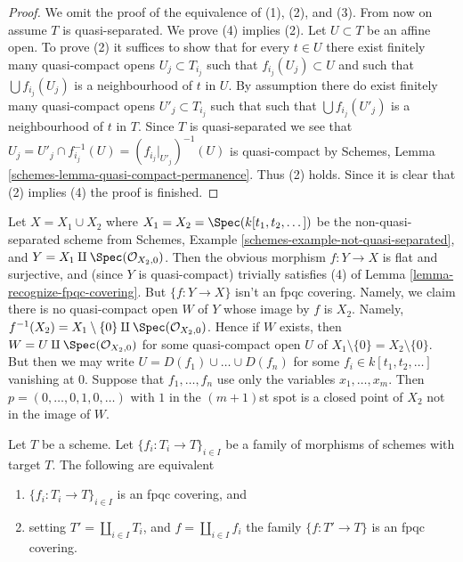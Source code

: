 \begin{proof}
We omit the proof of the equivalence of (1), (2), and (3).
From now on assume $T$ is quasi-separated.
We prove (4) implies (2). Let $U \subset T$ be an affine open.
To prove (2) it suffices to show that for every $t \in U$ there exist
finitely many quasi-compact opens $U_j \subset T_{i_j}$ such that
$f_{i_j}(U_j) \subset U$ and such that $\bigcup f_{i_j}(U_j)$
is a neighbourhood of $t$ in $U$. By assumption there do exist
finitely many quasi-compact opens $U'_j \subset T_{i_j}$ such that
such that $\bigcup f_{i_j}(U'_j)$ is a neighbourhood of $t$ in $T$.
Since $T$ is quasi-separated we see that
$U_j = U'_j \cap f_{i_j}^{-1}(U) = (f_{i_j}|_{U'_j})^{-1}(U)$
is quasi-compact by
Schemes, Lemma \ref{schemes-lemma-quasi-compact-permanence}.
Thus (2) holds. Since it is clear that (2) implies
(4) the proof is finished.
\end{proof}

\begin{example}
\label{example-not-fpqc}
Let $X = X_1 \cup X_2$ where $X_1 = X_2 = \Spec(k[t_1,t_2,\dots])$
be the non-quasi-separated scheme from
Schemes, Example \ref{schemes-example-not-quasi-separated}, and
$Y = X_1 \amalg \Spec(\mathcal{O}_{X_2, 0})$.
Then the obvious morphism $f : Y \to X$
is flat and surjective, and (since $Y$ is quasi-compact)
trivially satisfies (4) of Lemma \ref{lemma-recognize-fpqc-covering}.
But $\{f : Y \to X\}$ isn't an fpqc covering. Namely, we claim there
is no quasi-compact open $W$ of $Y$ whose image by $f$ is $X_2$.
Namely, $f^{-1}(X_2) = X_1 \setminus \{0\} \amalg \Spec(\mathcal{O}_{X_2, 0})$.
Hence if $W$ exists, then $W = U \amalg \Spec(\mathcal{O}_{X_2, 0})$
for some quasi-compact open $U$ of $X_1 \setminus \{0\} = X_2 \setminus \{0\}$.
But then we may write $U = D(f_1) \cup \ldots \cup D(f_n)$ for
some $f_i \in k[t_1, t_2, \ldots]$ vanishing at $0$.
Suppose that $f_1, \ldots, f_n$ use only the variables
$x_1, \ldots, x_m$. Then $p = (0, \ldots, 0, 1, 0, \ldots)$ with $1$
in the $(m + 1)$st spot is a closed point of $X_2$ not in the image
of $W$.
\end{example}

\begin{lemma}
\label{lemma-disjoint-union-is-fpqc-covering}
Let $T$ be a scheme. Let $\{f_i : T_i \to T\}_{i \in I}$ be a family of
morphisms of schemes with target $T$. The following are equivalent
\begin{enumerate}
\item $\{f_i : T_i \to T\}_{i \in I}$ is an fpqc covering, and
\item setting $T' = \coprod_{i \in I} T_i$, and $f = \coprod_{i \in I} f_i$
the family $\{f : T' \to T\}$ is an fpqc covering.
\end{enumerate}
\end{lemma}

